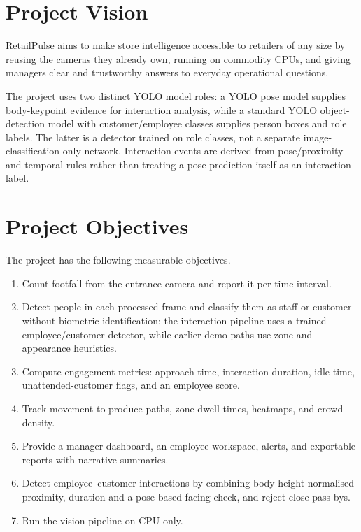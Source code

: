 \section{Project Vision}
RetailPulse aims to make store intelligence accessible to retailers of any size by reusing the cameras they already own, running on commodity CPUs, and giving managers clear and trustworthy answers to everyday operational questions.

The project uses two distinct YOLO model roles: a YOLO pose model supplies body-keypoint evidence for interaction analysis, while a standard YOLO object-detection model with customer/employee classes supplies person boxes and role labels. The latter is a detector trained on role classes, not a separate image-classification-only network. Interaction events are derived from pose/proximity and temporal rules rather than treating a pose prediction itself as an interaction label.

\section{Project Objectives}
The project has the following measurable objectives.
\begin{enumerate}[label=O\arabic*.]
\item Count footfall from the entrance camera and report it per time interval.
\item Detect people in each processed frame and classify them as staff or customer without biometric identification; the interaction pipeline uses a trained employee/customer detector, while earlier demo paths use zone and appearance heuristics.
\item Compute engagement metrics: approach time, interaction duration, idle time, unattended-customer flags, and an employee score.
\item Track movement to produce paths, zone dwell times, heatmaps, and crowd density.
\item Provide a manager dashboard, an employee workspace, alerts, and exportable reports with narrative summaries.
\item Detect employee--customer interactions by combining body-height-normalised proximity, duration and a pose-based facing check, and reject close pass-bys.
\item Run the vision pipeline on CPU only.
\end{enumerate}

